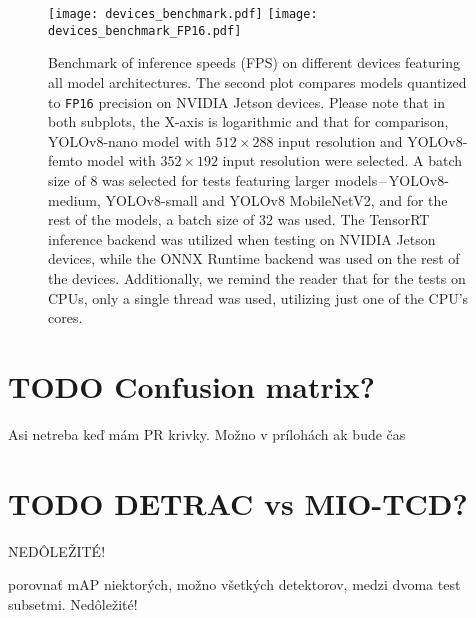\begin{figure}[H]
    \begin{framed}
        \centering
        \texttt{[image: devices\_benchmark.pdf]}
        \texttt{[image: devices\_benchmark\_FP16.pdf]}
        \caption{Benchmark of inference speeds (FPS) on different devices
        featuring all model architectures. The second plot compares models
        quantized to \texttt{FP16} precision on NVIDIA Jetson devices. Please
        note that in both subplots, the X-axis is logarithmic and that for
        comparison, YOLOv8-nano model with $512 \times 288$ input resolution and
        YOLOv8-femto model with $352 \times 192$ input resolution were selected.
        A batch size of 8 was selected for tests featuring larger
        models\,--\,YOLOv8-medium, YOLOv8-small and YOLOv8 MobileNetV2, and for
        the rest of the models, a batch size of 32 was used. The TensorRT
        inference backend was utilized when testing on NVIDIA Jetson devices,
        while the ONNX Runtime backend was used on the rest of the devices.
        Additionally, we remind the reader that for the tests on CPUs, only a
        single thread was used, utilizing just one of the CPU's cores.}
        \label{DevicesBenchmark}
    \end{framed}
\end{figure}








\section{TODO Confusion matrix?}

Asi netreba keď mám PR krivky. Možno v prílohách ak bude čas




\section{TODO DETRAC vs MIO-TCD?}

NEDÔLEŽITÉ!

porovnať mAP niektorých, možno všetkých detektorov, medzi dvoma test subsetmi. Nedôležité!

